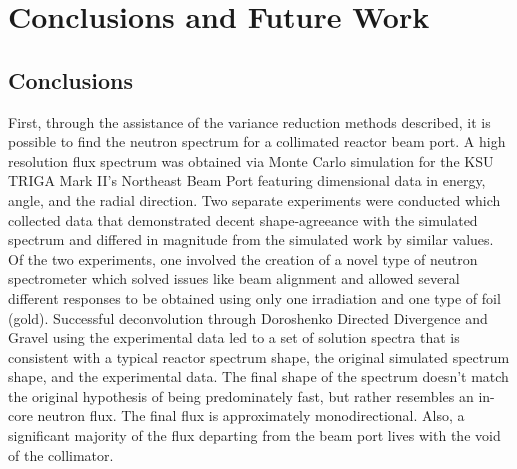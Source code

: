 
\cleardoublepage


\chapter{Conclusions and Future Work}

\section{Conclusions}
First, through the assistance of the variance reduction methods described, it is possible to find the neutron spectrum for a collimated reactor beam port.
A high resolution flux spectrum was obtained via Monte Carlo simulation for the KSU TRIGA Mark II's Northeast Beam Port featuring dimensional data in energy, angle, and the radial direction.
Two separate experiments were conducted which collected data that demonstrated decent shape-agreeance with the simulated spectrum and differed in magnitude from the simulated work by similar values.
Of the two experiments, one involved the creation of a novel type of neutron spectrometer which solved issues like beam alignment and allowed several different responses to be obtained using only one irradiation and one type of foil (gold).
Successful deconvolution through Doroshenko Directed Divergence and Gravel using the experimental data led to a set of solution spectra that is consistent with a typical reactor spectrum shape, the original simulated spectrum shape, and the experimental data.
The final shape of the spectrum doesn't match the original hypothesis of being predominately fast, but rather resembles an in-core neutron flux.
The final flux is approximately monodirectional.
Also, a significant majority of the flux departing from the beam port lives with the void of the collimator.



